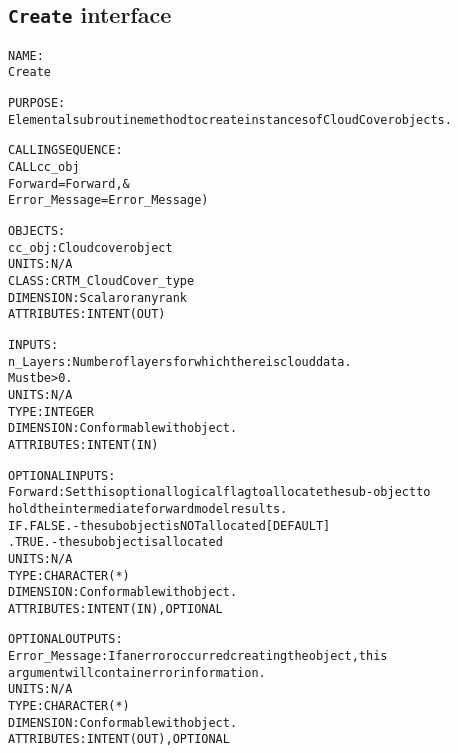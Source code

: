 \subsection{\texttt{Create} interface}
  \label{sec:Create_interface}
  \begin{alltt}
 
  NAME:
    Create
 
  PURPOSE:
    Elemental subroutine method to create instances of CloudCover objects.
 
  CALLING SEQUENCE:
    CALL cc_obj%Create( n_Layers, &
                        Forward       = Forward, &
                        Error_Message = Error_Message )
 
  OBJECTS:
    cc_obj:         Cloud cover object
                    UNITS:      N/A
                    CLASS:      CRTM_CloudCover_type
                    DIMENSION:  Scalar or any rank
                    ATTRIBUTES: INTENT(OUT)
 
  INPUTS:
    n_Layers:       Number of layers for which there is cloud data.
                    Must be > 0.
                    UNITS:      N/A
                    TYPE:       INTEGER
                    DIMENSION:  Conformable with object.
                    ATTRIBUTES: INTENT(IN)
 
  OPTIONAL INPUTS:
    Forward:        Set this optional logical flag to allocate the sub-object to
                    hold the intermediate forward model results.
                    IF .FALSE. - the subobject is NOT allocated [DEFAULT]
                       .TRUE.  - the subobject is allocated
                    UNITS:      N/A
                    TYPE:       CHARACTER(*)
                    DIMENSION:  Conformable with object.
                    ATTRIBUTES: INTENT(IN), OPTIONAL
 
  OPTIONAL OUTPUTS:
    Error_Message:  If an error occurred creating the object, this
                    argument will contain error information.
                    UNITS:      N/A
                    TYPE:       CHARACTER(*)
                    DIMENSION:  Conformable with object.
                    ATTRIBUTES: INTENT(OUT), OPTIONAL
 
  \end{alltt}
